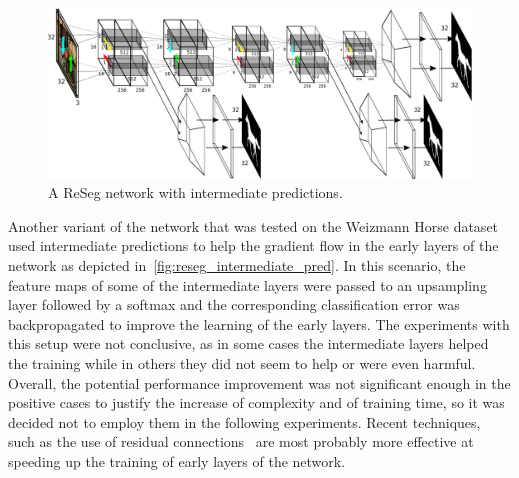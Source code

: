 \begin{figure}[t]
    \centering
    \includegraphics[width=\textwidth]{img/reseg/reseg_interm_pred.pdf}
    \caption{A ReSeg network with intermediate predictions.}
    \label{fig:reseg_intermediate_pred}
\end{figure}

Another variant of the network that was tested on the Weizmann Horse dataset
used intermediate predictions to help the gradient flow in the early layers
of the network as depicted in~\autoref{fig:reseg_intermediate_pred}. In this
scenario, the feature maps of some of the intermediate layers were passed to an
upsampling layer followed by a softmax and the corresponding classification
error was backpropagated to improve the learning of the early layers. The
experiments with this setup were not conclusive, as in some cases the
intermediate layers helped the training while in others they did not seem to
help or were even harmful. Overall, the potential performance improvement was
not significant enough in the positive cases to justify the increase of
complexity and of training time, so it was decided not to employ them in the
following experiments. Recent techniques, such as the use of residual
connections~\citep{he2015deep,srivastava2015training} are most probably more
effective at speeding up the training of early layers of the network.

\begin{table}[t]
    \caption{Oxford Flowers. Per pixel accuracy and average IoU are reported
        (higher is better).}
    \label{tbl:OxfordFlowers_SOTA}
\end{table}

